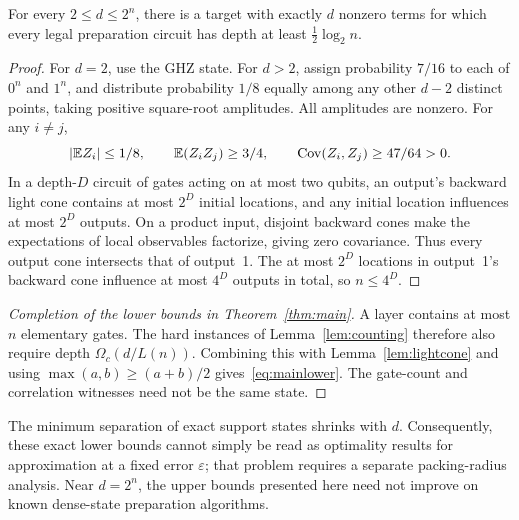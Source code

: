 \begin{lemma}\label{lem:lightcone}
For every $2\le d\le2^n$, there is a target with exactly $d$ nonzero terms for which every legal preparation circuit has depth at least $\tfrac12\log_2n$.
\end{lemma}
\begin{proof}
For $d=2$, use the GHZ state. For $d>2$, assign probability $7/16$ to each of $0^n$ and $1^n$, and distribute probability $1/8$ equally among any other $d-2$ distinct points, taking positive square-root amplitudes. All amplitudes are nonzero. For any $i\ne j$,
\[
|\mathbb E Z_i|\le1/8,\qquad \mathbb E(Z_iZ_j)\ge3/4,\qquad
\operatorname{Cov}(Z_i,Z_j)\ge47/64>0.
\]
In a depth-$D$ circuit of gates acting on at most two qubits, an output's backward light cone contains at most $2^D$ initial locations, and any initial location influences at most $2^D$ outputs. On a product input, disjoint backward cones make the expectations of local observables factorize, giving zero covariance. Thus every output cone intersects that of output~1. The at most $2^D$ locations in output~1's backward cone influence at most $4^D$ outputs in total, so $n\le4^D$.
\end{proof}

\begin{proof}[Completion of the lower bounds in Theorem~\ref{thm:main}]
A layer contains at most $n$ elementary gates. The hard instances of Lemma~\ref{lem:counting} therefore also require depth $\Omega_c(d/L(n))$. Combining this with Lemma~\ref{lem:lightcone} and using $\max(a,b)\ge(a+b)/2$ gives~\eqref{eq:mainlower}. The gate-count and correlation witnesses need not be the same state.
\end{proof}

The minimum separation of exact support states shrinks with $d$. Consequently, these exact lower bounds cannot simply be read as optimality results for approximation at a fixed error $\varepsilon$; that problem requires a separate packing-radius analysis. Near $d=2^n$, the upper bounds presented here need not improve on known dense-state preparation algorithms.
